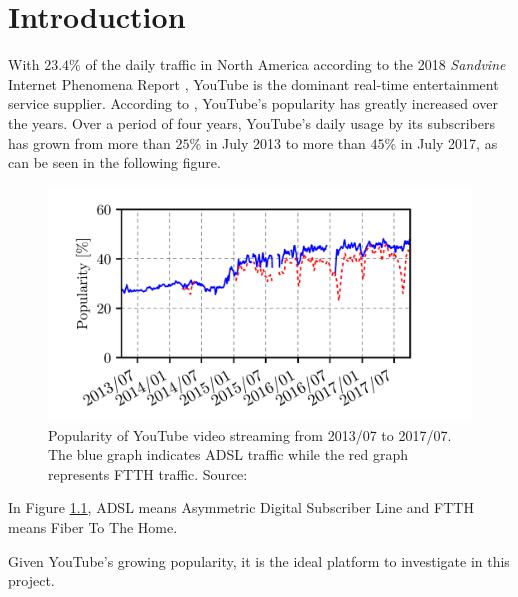 \chapter{Introduction} \label{chapter:intro}


With $23.4\%$ of the daily traffic in North America according to the 2018 \textit{Sandvine} Internet Phenomena Report \cite{sandvinereport}, YouTube is the dominant real-time entertainment service supplier. According to \cite{8976293}, YouTube's popularity has greatly increased over the years. Over a period of four years, YouTube's daily usage by its subscribers has grown from more than $25\%$ in July 2013 to more than $45\%$ in July 2017, as can be seen in the following figure.

\begin{figure}[H]
	\centering
	\includegraphics[scale=0.37]{Figures/trevisan2020.png}
	\caption[Popularity of YouTube video streaming]{Popularity of YouTube video streaming from 2013/07 to 2017/07. The blue graph indicates \gls{ADSL} traffic while the red graph represents \gls{FTTH} traffic. Source: \cite{8976293}}
	\label{fig:intro:trevisan}
\end{figure}

In Figure \ref{fig:intro:trevisan}, \gls{ADSL} means Asymmetric Digital Subscriber Line and \gls{FTTH} means Fiber To The Home.

Given YouTube's growing popularity, it is the ideal platform to investigate in this project.

